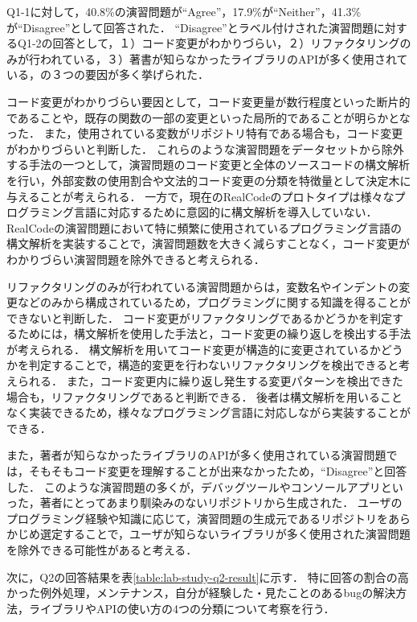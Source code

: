 Q1-1に対して，40.8\%の演習問題が``Agree''，17.9\%が``Neither''，41.3\%が``Disagree''として回答された．
``Disagree''とラベル付けされた演習問題に対するQ1-2の回答として，１）コード変更がわかりづらい，２）リファクタリングのみが行われている，３）著書が知らなかったライブラリのAPIが多く使用されている，の３つの要因が多く挙げられた．

コード変更がわかりづらい要因として，コード変更量が数行程度といった断片的であることや，既存の関数の一部の変更といった局所的であることが明らかとなった．
また，使用されている変数がリポジトリ特有である場合も，コード変更がわかりづらいと判断した．
これらのような演習問題をデータセットから除外する手法の一つとして，演習問題のコード変更と全体のソースコードの構文解析を行い，外部変数の使用割合や文法的コード変更の分類を特徴量として決定木に与えることが考えられる．
一方で，現在のRealCodeのプロトタイプは様々なプログラミング言語に対応するために意図的に構文解析を導入していない．
RealCodeの演習問題において特に頻繁に使用されているプログラミング言語の構文解析を実装することで，演習問題数を大きく減らすことなく，コード変更がわかりづらい演習問題を除外できると考えられる．

リファクタリングのみが行われている演習問題からは，変数名やインデントの変更などのみから構成されているため，プログラミングに関する知識を得ることができないと判断した．
コード変更がリファクタリングであるかどうかを判定するためには，構文解析を使用した手法と，コード変更の繰り返しを検出する手法が考えられる．
構文解析を用いてコード変更が構造的に変更されているかどうかを判定することで，構造的変更を行わないリファクタリングを検出できると考えられる．
また，コード変更内に繰り返し発生する変更パターンを検出できた場合も，リファクタリングであると判断できる．
後者は構文解析を用いることなく実装できるため，様々なプログラミング言語に対応しながら実装することができる．

また，著者が知らなかったライブラリのAPIが多く使用されている演習問題では，そもそもコード変更を理解することが出来なかったため，``Disagree''と回答した．
このような演習問題の多くが，デバッグツールやコンソールアプリといった，著者にとってあまり馴染みのないリポジトリから生成された．
ユーザのプログラミング経験や知識に応じて，演習問題の生成元であるリポジトリをあらかじめ選定することで，ユーザが知らないライブラリが多く使用された演習問題を除外できる可能性があると考える．

次に，Q2の回答結果を表\ref{table:lab-study-q2-result}に示す．
特に回答の割合の高かった例外処理，メンテナンス，自分が経験した・見たことのあるbugの解決方法，ライブラリやAPIの使い方の4つの分類について考察を行う．


